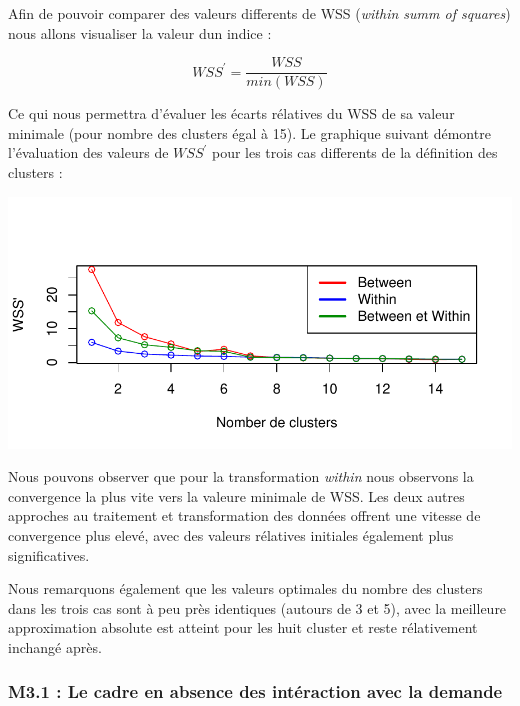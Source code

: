 \documentclass[11pt,]{article}
\begin{document}
Afin de pouvoir comparer des valeurs differents de WSS (\emph{within
summ of squares}) nous allons visualiser la valeur dun indice :

\begin{equation*}
    WSS^{'} = \frac{WSS}{min(WSS)}
\end{equation*}

Ce qui nous permettra d'évaluer les écarts rélatives du WSS de sa valeur
minimale (pour nombre des clusters égal à 15). Le graphique suivant
démontre l'évaluation des valeurs de \(WSS^{'}\) pour les trois cas
differents de la définition des clusters :

\FloatBarrier

\begin{center}\includegraphics{note2pres_files/figure-latex/unnamed-chunk-41-1} \end{center}

\FloatBarrier

Nous pouvons observer que pour la transformation \emph{within} nous
observons la convergence la plus vite vers la valeure minimale de WSS.
Les deux autres approches au traitement et transformation des données
offrent une vitesse de convergence plus elevé, avec des valeurs
rélatives initiales également plus significatives.

Nous remarquons également que les valeurs optimales du nombre des
clusters dans les trois cas sont à peu près identiques (autours de 3 et
5), avec la meilleure approximation absolute est atteint pour les huit
cluster et reste rélativement inchangé après.

\hypertarget{m3.1-le-cadre-en-absence-des-interaction-avec-la-demande}{%
\subsubsection{M3.1 : Le cadre en absence des intéraction avec la
demande}\label{m3.1-le-cadre-en-absence-des-interaction-avec-la-demande}}
\end{document}
